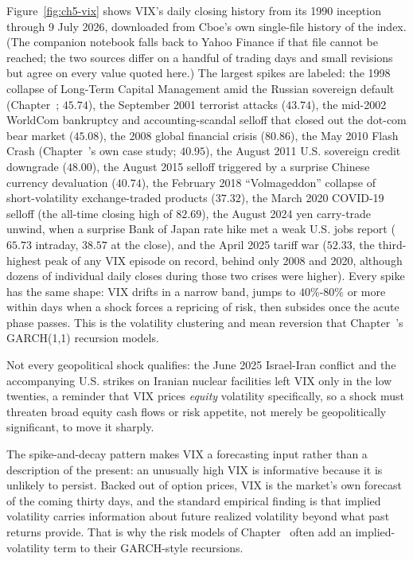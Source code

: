 \documentclass[../ai_in_finance]{subfiles}
\begin{document}
Figure~\ref{fig:ch5-vix} shows VIX's daily closing history from its 1990 inception through 9 July 2026, downloaded from Cboe's own single-file history of the index. (The companion notebook falls back to Yahoo Finance if that file cannot be reached; the two sources differ on a handful of trading days and small revisions but agree on every value quoted here.) The largest spikes are labeled: the 1998
collapse of Long-Term Capital Management amid the Russian sovereign default (Chapter~; $45.74$), the September 2001 terrorist attacks ($43.74$), the mid-2002
WorldCom bankruptcy and accounting-scandal selloff that closed out the dot-com bear market ($45.08$), the 2008 global financial crisis ($80.86$), the May 2010
Flash Crash (Chapter~'s own case study; $40.95$), the August 2011 U.S. sovereign credit downgrade ($48.00$), the August 2015 selloff triggered by a surprise
Chinese currency devaluation ($40.74$), the February 2018 ``Volmageddon'' collapse of short-volatility exchange-traded products ($37.32$), the March 2020
COVID-19 selloff (the all-time closing high of $82.69$), the August 2024 yen carry-trade unwind, when a surprise Bank of Japan rate hike met a weak U.S. jobs
report ($65.73$ intraday, $38.57$ at the close), and the April 2025 tariff war ($52.33$, the third-highest peak of any VIX episode on record, behind only 2008 and 2020, although dozens of individual daily closes during those two crises were higher). Every spike has the same shape:
VIX drifts in a narrow band, jumps to $40\%$-$80\%$ or more within days when a shock forces a repricing of risk, then subsides once the acute
phase passes. This is the volatility clustering and mean reversion that Chapter~'s GARCH(1,1) recursion models.

Not every geopolitical shock qualifies: the June 2025 Israel-Iran conflict and the accompanying U.S. strikes on Iranian nuclear facilities left VIX only in the
low twenties, a reminder that VIX prices \emph{equity} volatility specifically, so a shock must threaten broad equity cash flows or risk appetite, not merely be
geopolitically significant, to move it sharply.

The spike-and-decay pattern makes VIX a forecasting input rather than a description of the present: an unusually high VIX is informative because it is unlikely to persist. Backed out of option prices, VIX is the market's own
forecast of the coming thirty days, and the standard empirical finding is that implied volatility carries information about future realized volatility beyond
what past returns provide. That is why the risk models of Chapter~ often add an implied-volatility term
to their GARCH-style recursions.
\end{document}
